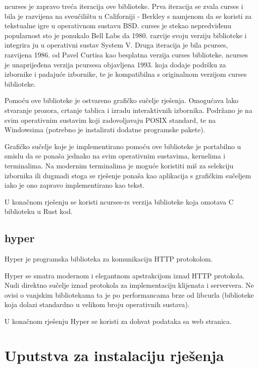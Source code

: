 \documentclass[times, utf8, zavrsni]{fer}
\begin{document}
ncurses je zapravo treća iteracija ove biblioteke. Prva iteracija se zvala
curses i bila je razvijena na sveučilištu u Californiji - Berkley s namjenom
da se koristi za tekstualne igre u operativnom sustavu BSD. curses je stekao
nepredviđenu popularnost sto je ponukalo Bell Labs da 1980. razvije svoju
verziju biblioteke i integrira ju u operativni sustav System V. Druga
iteracija je bila pcurses, razvijena 1986. od Pavel Curtisa kao besplatna
verzija curses biblioteke. ncurses je unaprijeđena verzija pcursesa objavljena
1993. koja dodaje podršku za izbornike i padajuće izbornike, te je kompatibilna
s originalnom verzijom curses biblioteke.

Pomoću ove biblioteke je ostvareno grafičko sučelje rješenja. Omogućava lako
stvaranje prozora, crtanje tablica i izradu interaktivnih izbornika. Podržano
je na svim operativnim sustavim koji zadovoljavaju POSIX standard, te na
Windowsima (potrebno je instalirati dodatne programske pakete).

Grafičko sučelje koje je implementirano pomoću ove biblioteke je portabilno u
smislu da se ponaša jednako na svim operativnim sustavima, kernelima i
terminalima. Na modernim terminalima je moguće koristiti miš za selekciju
izbornika ili dugmadi stoga se rješenje ponaša kao aplikacija s grafičkim
sučeljem iako je ono zapravo implementirano kao tekst.

U konačnom rješenju se koristi ncurses-rs \cite{ncurses_rs_repository} verzija
biblioteke koja omotava C biblioteku u Rust kod.

\subsection{hyper}

Hyper \cite{hyper_repository} je programska biblioteka za komunikaciju HTTP
protokolom.

Hyper se smatra modernom i elegantnom apstrakcijom iznad HTTP protokola.
Nudi direktno sučelje iznad protokola za implementaciju klijenata i serververa.
Ne ovisi o vanjskim bibliotekama ta je po performancama brze od libcurla
(biblioteke koja dolazi standardno u velikom broju operativnih sustava).

U konačnom rješenju Hyper se koristi za dohvat podataka sa web stranica.

\section{Uputstva za instalaciju rješenja}
\end{document}
